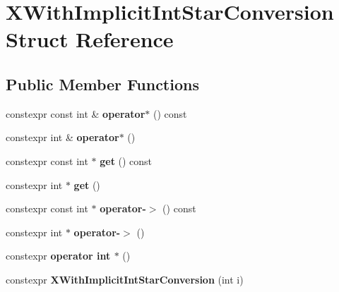 \hypertarget{struct_x_with_implicit_int_star_conversion}{}\section{X\+With\+Implicit\+Int\+Star\+Conversion Struct Reference}
\label{struct_x_with_implicit_int_star_conversion}
\subsection*{Public Member Functions}
\begin{DoxyCompactItemize}
\item 
\mbox{\label{struct_x_with_implicit_int_star_conversion_a8ef9c427c106d0d9669ffc4729d39eb7}} 
constexpr const int \& {\bfseries operator$\ast$} () const
\item 
\mbox{\label{struct_x_with_implicit_int_star_conversion_a0fcce127da6b60b7bd3ae8576bfd63c5}} 
constexpr int \& {\bfseries operator$\ast$} ()
\item 
\mbox{\label{struct_x_with_implicit_int_star_conversion_a511a356107db529a98d1472e6f4646b3}} 
constexpr const int $\ast$ {\bfseries get} () const
\item 
\mbox{\label{struct_x_with_implicit_int_star_conversion_a6e48fdf51bef7894866ca27a444d5f86}} 
constexpr int $\ast$ {\bfseries get} ()
\item 
\mbox{\label{struct_x_with_implicit_int_star_conversion_adfdce72880440b4cbd9eda878ce8c2cd}} 
constexpr const int $\ast$ {\bfseries operator-\/$>$} () const
\item 
\mbox{\label{struct_x_with_implicit_int_star_conversion_a273da49bf50a74a440fa3495d9cd4c8e}} 
constexpr int $\ast$ {\bfseries operator-\/$>$} ()
\item 
\mbox{\label{struct_x_with_implicit_int_star_conversion_ad18e21a37af9ceeb58347e33ea2e5b49}} 
constexpr {\bfseries operator int $\ast$} ()
\item 
\mbox{\label{struct_x_with_implicit_int_star_conversion_a320ed1235a46853f35d0f47d565a9345}} 
constexpr {\bfseries X\+With\+Implicit\+Int\+Star\+Conversion} (int i)
\end{DoxyCompactItemize}
